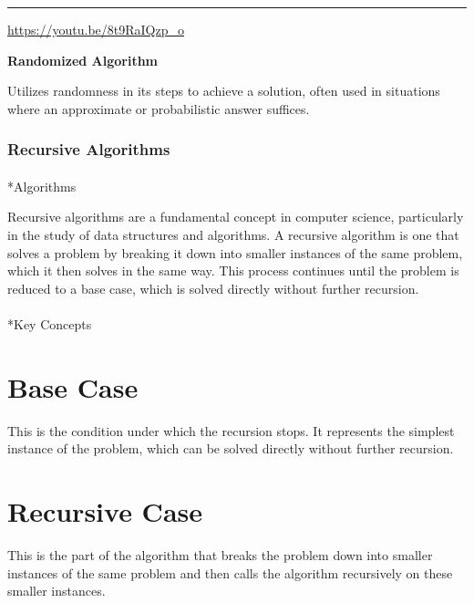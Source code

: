 \documentclass[
  letterpaper,
  DIV=11,
  numbers=noendperiod]{scrreprt}
\makeatletter
\let\oldparagraph\paragraph
\renewcommand{\paragraph}{
    \@ifstar
      \xxxParagraphStar
      \xxxParagraphNoStar
  }
\newcommand{\xxxParagraphStar}[1]{\oldparagraph*{#1}\mbox{}}
\newcommand{\xxxParagraphNoStar}[1]{\oldparagraph{#1}\mbox{}}
\makeatother
\begin{document}
\begin{center}\rule{0.5\linewidth}{0.5pt}\end{center}

\url{https://youtu.be/8t9RaIQzp_o}

\textbf{Randomized Algorithm}

Utilizes randomness in its steps to achieve a solution, often used in
situations where an approximate or probabilistic answer suffices.

\subsubsection*{Recursive Algorithms}\label{recursive-algorithms}

\paragraph*{Algorithms}\label{algorithms}

Recursive algorithms are a fundamental concept in computer science,
particularly in the study of data structures and algorithms. A recursive
algorithm is one that solves a problem by breaking it down into smaller
instances of the same problem, which it then solves in the same way.
This process continues until the problem is reduced to a base case,
which is solved directly without further recursion.

\paragraph*{Key Concepts}\label{key-concepts}

\section{Base Case}

This is the condition under which the recursion stops. It represents the
simplest instance of the problem, which can be solved directly without
further recursion.

\section{Recursive Case}

This is the part of the algorithm that breaks the problem down into
smaller instances of the same problem and then calls the algorithm
recursively on these smaller instances.
\end{document}
